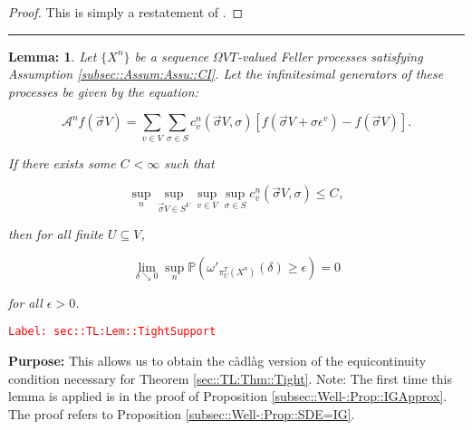 \documentclass[12pt]{article}
\newcommand{\mb}{\mathbb}
\newcommand{\mc}{\mathcal}
\newcommand{\ep}{\epsilon}
\newcommand{\tr}{\textcolor{red}}
\newcommand{\labe}[1]{\tr{\texttt{Label: #1}}}
\newcommand{\purpose}{\textbf{Purpose: }}
\newcommand{\lin}{\rule{\linewidth}{0.4 pt}}
\newcommand{\pr}{\mb{P}}							%
\renewcommand{\v}{v}							%
\renewcommand{\U}{U}							%
\renewcommand{\S}{S}							%
\newcommand{\s}{\sigma}							%
\newcommand{\sv}{\vec{\s}}						%
\newcommand{\ev}[1]{\ep^{#1}}					%
\newcommand{\T}{T}								%
\newcommand{\IG}{\mc{A}}						%
\newcommand{\pup}[1]{^{#1}}							%
\newcommand{\V}{V}									%
\newcommand{\numb}{n}								%
\newcommand{\XState}[1]{\S^{#1}}				%
\newcommand{\piV}[2]{\pi_{#1}^{#2}}					%
\newcommand{\rxvtsn}[3]{X_{#1}^{#3}{#2}}			%
\newcommand{\IGr}[1]{c_{#1}}						%
\newcommand{\const}[1]{C_{#1}}						%
\newtheorem{lem}[thms]{Lemma: }
\begin{document}
\begin{proof}
This is simply a restatement of \cite[Theorem 13.2]{Bil99}.
\end{proof}

\lin

\begin{lem}
Let \(\{\rxvtsn{}{}{\numb}\}\) be a sequence \(\Omega{\V}{\T}\)-valued Feller processes satisfying Assumption \ref{subsec::Assum:Assu::CI}. Let the infinitesimal generators of these processes be given by the equation:

\[\IG\pup{\numb}f(\sv{}{\V}) = \sum_{\v\in \V}\sum_{\s \in \S} \IGr{\v}\pup{\numb}(\sv{}{\V},\s)[f(\sv{}{\V} + \s\ev{\v}) - f(\sv{}{\V})].\]

If there exists some \(\const{} < \infty\) such that

\[\sup_{\numb}\sup_{\sv{}{\V}\in \S^\V}\sup_{\v\in\V}\sup_{\s\in \S} \IGr{\v}\pup{\numb}(\sv{}{\V},\s) \leq \const{},\]

then for all finite \(\U \subseteq \V\),

\[\lim_{\delta \searrow 0} \sup_\numb \pr\left(\omega'_{\piV{\U}{\T}\left(\rxvtsn{}{}{\numb}\right)}(\delta) \geq \ep\right) = 0\]

for all \(\ep > 0\).
\label{sec::TL:Lem::TightSupport}
\end{lem}
\labe{sec::TL:Lem::TightSupport}

\purpose This allows us to obtain the c\`adl\`ag version of the equicontinuity condition necessary for Theorem \ref{sec::TL:Thm::Tight}. Note: The first time this lemma is applied is in the proof of Proposition \ref{subsec::Well-:Prop::IGApprox}. The proof refers to Proposition \ref{subsec::Well-:Prop::SDE=IG}.
\end{document}
